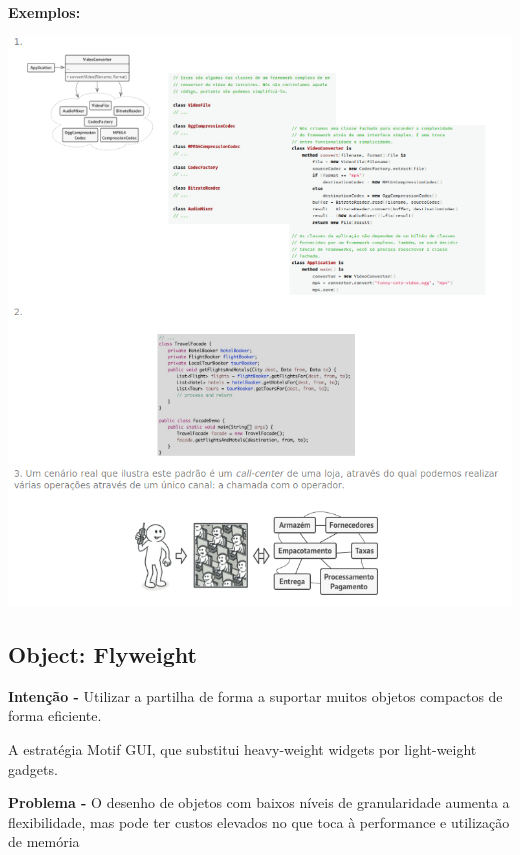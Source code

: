 \documentclass{article}
\begin{document}
\pagebreak

\begin{flushleft}
    \textbf{Exemplos:}

    \begin{center}
        \includegraphics[scale=0.55]{Images/51.png}
    \end{center}
\end{flushleft}

\pagebreak

\subsection{Object: Flyweight}

\begin{flushleft}
    \textbf{Intenção -} Utilizar a partilha de forma a suportar muitos objetos compactos de forma eficiente.

    A estratégia Motif GUI, que substitui heavy-weight widgets por light-weight gadgets.
\end{flushleft}

\begin{flushleft}
    \textbf{Problema -} O desenho de objetos com baixos níveis de granularidade aumenta a flexibilidade,
    mas pode ter custos elevados no que toca à performance e utilização de memória
\end{flushleft}
\end{document}
